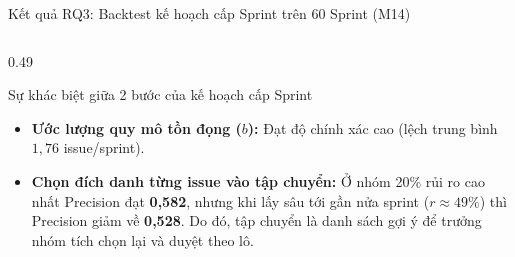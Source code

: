 \begin{frame}{Kết quả RQ3: Backtest kế hoạch cấp Sprint trên 60 Sprint (M14)}
\begin{columns}[T,onlytextwidth]
\begin{column}{0.49\textwidth}
      \raggedright
      \begin{alertblock}{Sự khác biệt giữa 2 bước của kế hoạch cấp Sprint}
        \begin{itemize}
          \setlength{\itemsep}{1.2pt}
          \item \textbf{Ước lượng quy mô tồn đọng ($b$):} Đạt độ chính xác cao (lệch trung bình $1{,}76$ issue/sprint).
          \item \textbf{Chọn đích danh từng issue vào tập chuyển:} Ở nhóm 20\% rủi ro cao nhất Precision đạt \textbf{0,582}, nhưng khi lấy sâu tới gần nửa sprint ($r \approx 49\%$) thì Precision giảm về \textbf{0,528}. Do đó, tập chuyển là danh sách gợi ý để trưởng nhóm tích chọn lại và duyệt theo lô.
        \end{itemize}
      \end{alertblock}
    \end{column}
  \end{columns}
\end{frame}

